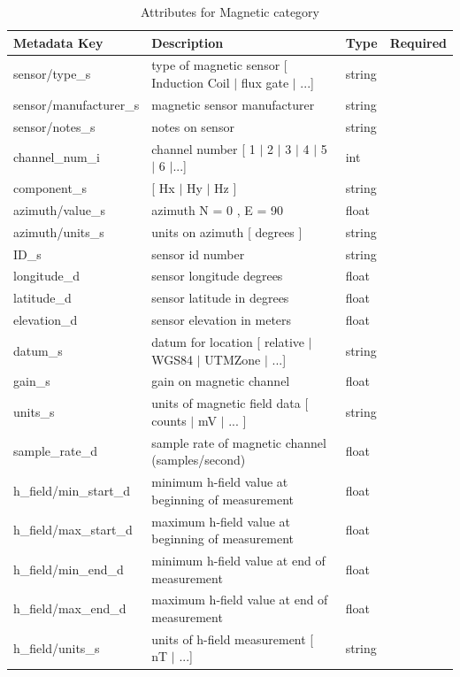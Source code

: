 \documentclass{article}
\begin{document}
\begin{table}[htb!]
	\caption[Attributes for Magnetic Channel]{Attributes for Magnetic category}
	\begin{tabular}{|l|p{3in}|l|l|}
		\hline
		\textbf{Metadata Key} & \textbf{Description} & \textbf{Type} & \textbf{Required} \\ \hline
		sensor/type\_s & type of magnetic sensor [ Induction Coil $|$ flux gate $|$ ...] & string & \\ \hline
		sensor/manufacturer\_s & magnetic sensor manufacturer & string &  \\ \hline
		sensor/notes\_s & notes on sensor & string &  \\ \hline
		channel\_num\_i & channel number [ 1 $|$ 2 $|$ 3 $|$ 4 $|$ 5 $|$ 6 $|$...] & int &  \\ \hline
		component\_s & [ Hx $|$ Hy $|$ Hz ] & string  &  \\ \hline
		azimuth/value\_s & azimuth N = 0 ,  E = 90 & float &  \\ \hline
		azimuth/units\_s & units on azimuth [ degrees ] & string &  \\ \hline
		ID\_s & sensor id number & string &  \\ \hline
		longitude\_d & sensor longitude degrees & float &  \\ \hline
		latitude\_d & sensor latitude in degrees & float &  \\ \hline
		elevation\_d & sensor elevation in meters & float &  \\ \hline
		datum\_s & datum for location [ relative $|$ WGS84 $|$ UTMZone $|$ ...] & string &  \\ \hline
		gain\_s & gain on magnetic channel & float &  \\ \hline
		units\_s & units of magnetic field data [ counts $|$ mV $|$ ... ] & string &  \\ \hline
		sample\_rate\_d & sample rate of magnetic channel (samples/second) & float &  \\ \hline
		h\_field/min\_start\_d & minimum h-field value at beginning of measurement & float &  \\ \hline
		h\_field/max\_start\_d & maximum h-field value at beginning of measurement & float &  \\ \hline
		h\_field/min\_end\_d & minimum h-field value at end of measurement & float &  \\ \hline
		h\_field/max\_end\_d & maximum h-field value at end of measurement & float &  \\ \hline
		h\_field/units\_s & units of h-field measurement [ nT $|$ ...] & string &  \\ \hline

\end{tabular}
\end{table}
\end{document}
